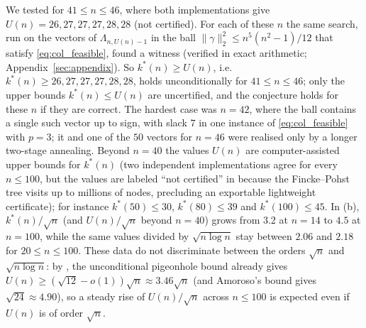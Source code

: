 We tested  for $41\le n\le46$, where both implementations give $U(n)=26,27,27,27,28,28$ (not certified).
For each of these $n$ the same search, run on the vectors of $\Lambda_{n,U(n)-1}$ in the ball $\|\gamma\|_2^2\le n^5(n^2-1)/12$ that satisfy \eqref{eq:col_feasible}, found a witness (verified in exact arithmetic; Appendix~\ref{sec:appendix}).
So $k^*(n)\ge U(n)$, i.e.\ $k^*(n)\ge26,27,27,27,28,28$, holds unconditionally for $41\le n\le46$; only the upper bounds $k^*(n)\le U(n)$ are uncertified, and the conjecture holds for these $n$ if they are correct.
The hardest case was $n=42$, where the ball contains a single such vector up to sign, with slack $7$ in one instance of \eqref{eq:col_feasible} with $p=3$; it and one of the $50$ vectors for $n=46$ were realised only by a longer two-stage annealing.
Beyond $n=40$ the values $U(n)$ are computer-assisted upper bounds for $k^*(n)$ (two independent implementations agree for every $n\le100$, but the values are labeled ``not certified'' in  because the Fincke--Pohst tree visits up to millions of nodes, precluding an exportable lightweight certificate); for instance $k^*(50)\le30$, $k^*(80)\le39$ and $k^*(100)\le45$.
In (b), $k^*(n)/\sqrt n$ (and $U(n)/\sqrt n$ beyond $n=40$) grows from $3.2$ at $n=14$ to $4.5$ at $n=100$, while the same values divided by $\sqrt{n\log n}$ stay between $2.06$ and $2.18$ for $20\le n\le100$.
These data do not discriminate between the orders $\sqrt n$ and $\sqrt{n\log n}$: by , the unconditional pigeonhole bound already gives $U(n)\ge(\sqrt{12}-o(1))\sqrt n\approx3.46\sqrt n$ (and Amoroso's bound gives $\sqrt{24}\approx4.90$), so a steady rise of $U(n)/\sqrt n$ across $n\le100$ is expected even if $U(n)$ is of order $\sqrt n$.
